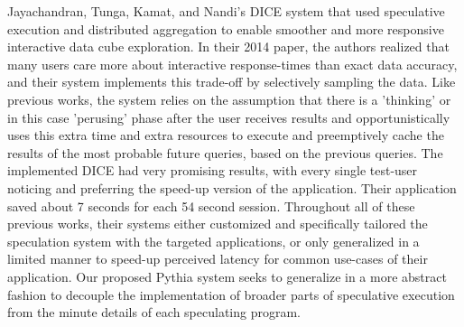 Jayachandran, Tunga, Kamat, and Nandi's DICE system that used speculative execution and distributed aggregation to enable smoother and more responsive interactive data cube exploration. In their 2014 paper, the authors realized that many users care more about interactive response-times than exact data accuracy, and their system implements this trade-off by selectively sampling the data. Like previous works, the system relies on the assumption that there is a 'thinking' or in this case 'perusing' phase after the user receives results and opportunistically uses this extra time and extra resources to execute and preemptively cache the results of the most probable future queries, based on the previous queries. The implemented DICE had very promising results, with every single test-user noticing and preferring the speed-up version of the application. Their application saved about 7 seconds for each 54 second session. Throughout all of these previous works, their systems either customized and specifically tailored the speculation system with the targeted applications, or only generalized in a limited manner to speed-up perceived latency for common use-cases of their application. Our proposed Pythia system seeks to generalize in a more abstract fashion to decouple the implementation of broader parts of speculative execution from the minute details of each speculating program.
